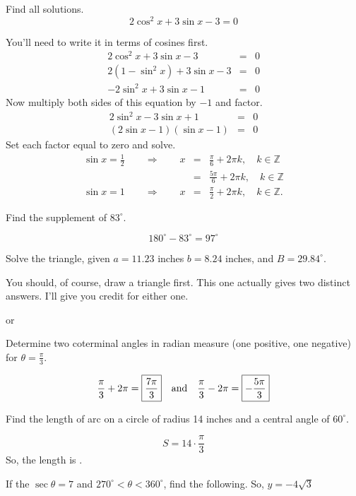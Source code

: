 \documentclass[12pt,addpoints, answers, fleqn]{exam}
\begin{document}
\begin{questions}
\question Find all solutions.
\[
2 \cos^2 x + 3 \sin x - 3 = 0
\]
\begin{solution} You'll need to write it in terms of cosines first.
\begin{eqnarray*}
2 \cos^2 x + 3 \sin x - 3 &=& 0\\
2 \left( 1 - \sin^2 x \right) + 3 \sin x - 3 &=& 0\\
-2 \sin^2 x  + 3 \sin x - 1 &=& 0
\end{eqnarray*}
Now multiply both sides of this equation by $-1$ and factor.
\begin{eqnarray*}
2\sin^2 x  - 3 \sin x + 1 &=& 0\\
\left(2 \sin x - 1  \right) \left(\sin x - 1 \right) &=& 0
\end{eqnarray*}
Set each factor equal to zero and solve.
\begin{eqnarray*}
\sin x = \frac{1}{2} \qquad \Rightarrow \qquad x &=& \boxed{\frac{\pi}{6} + 2 \pi k, \quad k \in \mathbb{Z}} \\
&=& \boxed{\frac{5\pi}{6} + 2 \pi k, \quad k \in \mathbb{Z}} \\
\sin x = 1 \qquad \Rightarrow \qquad x &=& \boxed{\frac{\pi}{2} + 2 \pi k, \quad k \in \mathbb{Z}}.
\end{eqnarray*}
\end{solution}
\question Find the supplement of $83^\circ$.
\begin{solution}
\[
180^\circ-83^\circ=\boxed{97^\circ}
\]
\end{solution}
\question Solve the triangle, given $a = 11.23$ inches $b = 8.24$ inches, and $B = 29.84^\circ$.
\begin{solution}
You should, of course, draw a triangle first. This one actually gives two distinct answers. I'll give you credit for either one.


or

\end{solution}
\question Determine two coterminal angles in radian measure (one positive, one negative) for $\theta = \displaystyle \frac{\pi}{3}$.
\begin{solution}
\[
\frac{\pi}{3} + 2 \pi = \boxed{\frac{7\pi}{3}} \quad {\rm{and}} \quad
\frac{\pi}{3} - 2 \pi = \boxed{-\frac{5\pi}{3}}
\]
\end{solution}
\question Find the length of arc on a circle of radius 14 inches and a central angle of $60^\circ$.
\begin{solution}
\[
S = 14 \cdot \frac{\pi}{3}
\]
So, the length is .
\end{solution}
\question If the $\sec \theta = 7$ and $270^\circ < \theta < 360^\circ$, find the following.
So, $y = -4\sqrt{3}$
\begin{parts}

\end{parts}
\end{questions}
\end{document}
